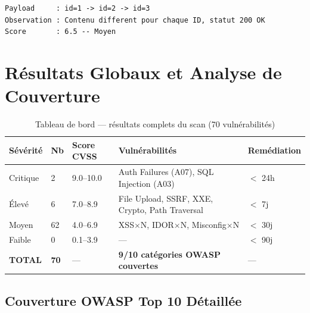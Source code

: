 \documentclass[12pt,a4paper]{report}
\newcommand{\hdr}[1]{\cellcolor{gray!15}\textbf{#1}}
\newcommand{\rowB}{\rowcolor{white}}
\begin{document}
\begin{lstlisting}[style=bash, caption={Résultat — IDOR}]
Payload     : id=1 -> id=2 -> id=3
Observation : Contenu different pour chaque ID, statut 200 OK
Score       : 6.5 -- Moyen
\end{lstlisting}

\section{Résultats Globaux et Analyse de Couverture}

\begin{table}[h!]
\centering
\caption{Tableau de bord — résultats complets du scan (70 vulnérabilités)}
\begin{tabular}{p{2cm}p{1cm}p{2cm}p{6cm}p{2cm}}
\toprule
\hdr{Sévérité} & \hdr{Nb} & \hdr{Score CVSS} & \hdr{Vulnérabilités} & \hdr{Remédiation} \\
\midrule
\rowcolor{gray!15} Critique & 2 & 9.0–10.0 & Auth Failures (A07), SQL Injection (A03) & $<$ 24h \\
\rowcolor{gray!8} Élevé & 6 & 7.0–8.9 & File Upload, SSRF, XXE, Crypto, Path Traversal & $<$ 7j \\
\rowcolor{white} Moyen & 62 & 4.0–6.9 & XSS$\times$N, IDOR$\times$N, Misconfig$\times$N & $<$ 30j \\
\rowB Faible & 0 & 0.1–3.9 & — & $<$ 90j \\
\midrule
\textbf{TOTAL} & \textbf{70} & — & \textbf{9/10 catégories OWASP couvertes} & — \\
\bottomrule
\end{tabular}
\end{table}

\subsection{Couverture OWASP Top 10 Détaillée}
\end{document}
